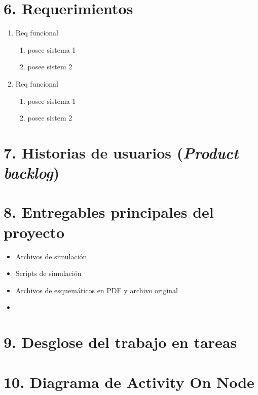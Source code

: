 \documentclass[
11pt, %
]{charter}
\begin{document}
\section{6. Requerimientos}
\label{sec:requerimientos}
\begin{enumerate}
	\item Req funcional
		\begin{enumerate}
			\item posee sistema 1 
			\item posee sistem 2 
			
		\end{enumerate}

	\item Req funcional
		\begin{enumerate}
			\item posee sistema 1 
			\item posee sistem 2 	
		\end{enumerate}



\end{enumerate}



\section{7. Historias de usuarios (\textit{Product backlog})}
\label{sec:backlog}


\section{8. Entregables principales del proyecto}
\label{sec:entregables}
\begin{itemize}
	\item Archivos de simulación 
	\item Scripts de simulación 
	\item Archivos de esquemáticos en PDF y archivo original 
	\item 

\end{itemize}

\section{9. Desglose del trabajo en tareas}
\label{sec:wbs}

\section{10. Diagrama de Activity On Node}
\label{sec:AoN}
\end{document}
